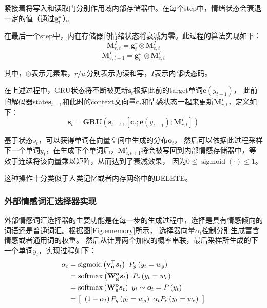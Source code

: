 \documentclass[supercite]{HustGraduPaper}
\theoremstyle{definition}
\begin{document}
紧接着将写入和读取门分别作用域内部存储器中。在每个step中，情绪状态会衰退一定的值（通过$\boldsymbol{g}_t^w$）。

在最后一个step中，内在存储器的情绪状态将衰减为零。此过程的算法实现如下：
$$\boldsymbol { M } _ { r , t } ^ { I } = \boldsymbol { g } _ { t } ^ { r } \otimes \boldsymbol { M } _ { e , t } ^ { I }$$
$$\boldsymbol { M } _ { e , t + 1 } ^ { I } = \boldsymbol { g } _ { t } ^ { w } \otimes \boldsymbol { M } _ { e , t } ^ { I }$$

其中，$\otimes$表示元素乘，$r/w$分别表示为读和写，$I$表示内部状态码。

在上述过程中，GRU状态将不断被更新$\boldsymbol{s}_t$根据此前的target单词$\boldsymbol{e}(y_{t-1})$，
此前的解码器state$\boldsymbol{s}_{t-1}$和此时的context文向量$\boldsymbol{c}_t$和情感状态一起来更新$\boldsymbol{M}_{r,t}^I$，定义如下：
$$\boldsymbol { s } _ { t } = \mathbf { G } \mathbf { R } \mathbf { U } \left( \boldsymbol { s } _ { t - 1 } , \left[ \boldsymbol { c } _ { t } ; \boldsymbol { e } \left( y _ { t - 1 } \right) ; \boldsymbol { M } _ { r , t } ^ { I } \right] \right)$$

基于状态$s_t$，可以获得单词在向量空间中生成的分布$\boldsymbol{o}_t$，
然后可以依据此过程采样下一个单词$y_t$，在生成下个单词后，$\boldsymbol{M}_{e,t+1}^I$将会被写回到内部情感存储器中，等效于连续将该向量乘以矩阵，从而达到了衰减效果，
因为$0 \leq \operatorname { sigmoid } ( \cdot ) \leq 1$。

这种操作十分类似于人类记忆或者内存网络中的DELETE\cite{miller1956human}。

\subsubsection{外部情感词汇选择器实现}
外部情感词汇选择器的主要功能是在每一步的生成过程中，选择是具有情感倾向的词语还是普通词汇。根据图\ref{Fig.ememory}所示，
选择器向量$\alpha_t$控制分别生成富含情感或者通用词的权重。
然后从计算两个加权的概率串联，最后采样所生成的下一个单词$y_t$，实现过程如下：
\begin{align} 
  \alpha _ { t } \notag
  &= \operatorname { sigmoid } \left( \mathbf { v } _ { \mathbf { u } } ^ { \top } \boldsymbol { s } _ { t } \right) \ P _ { g } \left( y _ { t } = w _ { g } \right) \\\notag
  & = \operatorname { softmax } \left( \mathbf { W } _ { \mathbf { g } } ^ { \mathbf { o } } \boldsymbol { s } _ { t } \right) \ P _ { e } \left( y _ { t } = w _ { e } \right) \\\notag
  & = \operatorname { softmax } \left( \mathbf { W } _ { \mathbf { e } } ^ { \mathbf { o } } \boldsymbol { s } _ { t } \right) \ y _ { t } \sim \boldsymbol { o } _ { t } = P \left( y _ { t } \right) \\\notag
  & = \left[ \begin{array} { c } \left( 1 - \alpha _ { t } \right) P _ { g } \left( y _ { t } = w _ { g } \right) \ \alpha _ { t } P _ { e } \left( y _ { t } = w _ { e } \right) \end{array} \right] \notag
\end{align}
\end{document}

